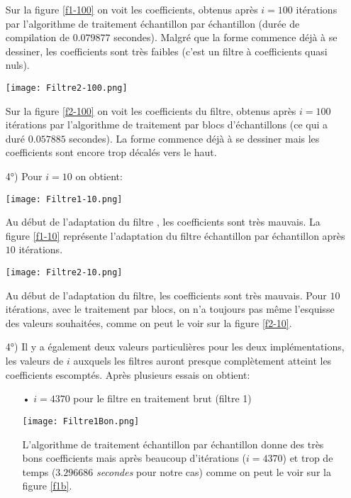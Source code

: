 \begin{itemize}
Sur la figure \ref{f1-100} on voit les coefficients, obtenus après $ i=100 $ itérations par l'algorithme de traitement échantillon par échantillon (durée de compilation de $ 0.079877 $ secondes). Malgré que la forme commence déjà à se dessiner, les coefficients sont très faibles (c'est un filtre à coefficients quasi nuls).
\begin{center}
\texttt{[image: Filtre2-100.png]}
\label{f2-100}
\end{center}
Sur la figure \ref{f2-100} on voit les coefficients du filtre, obtenus après $ i=100 $ itérations par l'algorithme de traitement par blocs d'échantillons (ce qui a duré $ 0.057885 $ secondes). La forme commence déjà à se dessiner mais les coefficients sont encore trop décalés vers le haut.
\item[4°)] Pour $ i=10 $ on obtient:
\begin{center}
\texttt{[image: Filtre1-10.png]}
\label{f1-10}
\end{center}
Au début de l'adaptation du filtre , les coefficients sont très mauvais. La figure \ref{f1-10} représente l'adaptation du filtre échantillon par échantillon après $ 10 $ itérations. 
\begin{center}
\texttt{[image: Filtre2-10.png]}
\label{f2-10}
\end{center}
Au début de l'adaptation du filtre, les coefficients sont très mauvais. Pour $ 10 $ itérations, avec le traitement par blocs, on n'a toujours pas même l'esquisse des valeurs souhaitées, comme on peut le voir sur la figure \ref{f2-10}.
\item[4°)] Il y a également deux valeurs particulières pour les deux implémentations, les valeurs de $ i $ auxquels les filtres auront presque complètement atteint les coefficients escomptés. Après plusieurs essais on obtient:
\begin{itemize}
\item[•] $ i=4370 $ pour le filtre en traitement brut (filtre 1)
\begin{center}
\texttt{[image: Filtre1Bon.png]}
\label{f1b}
\end{center}
L'algorithme de traitement échantillon par échantillon donne des très bons coefficients mais après beaucoup d'itérations ($ i=4370 $) et trop de temps ($ 3.296686 $ \emph{secondes} pour notre cas) comme on peut le voir sur la figure \ref{f1b}.

\end{itemize}
\end{itemize}
